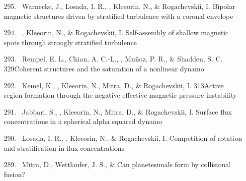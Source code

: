 \begin{itemize}
\item[{295.}~]
Warnecke, J., Losada, I. R., \Brandenburg, Kleeorin, N., \& Rogachevskii, I.
{Bipolar magnetic structures driven by stratified turbulence with a coronal envelope}

\item[{294.}~]
\Brandenburg, Kleeorin, N., \& Rogachevskii, I.
{Self-assembly of shallow magnetic spots through strongly stratified turbulence}

\item[{293.}~]
Rempel, E. L., Chian, A. C.-L., \Brandenburg, Mu\~noz, P. R., \& Shadden, S. C.
{329}{Coherent structures and the saturation of a nonlinear dynamo}

\item[{292.}~]
Kemel, K., \Brandenburg, Kleeorin, N., Mitra, D., \& Rogachevskii, I.
{313}{Active region formation through the negative effective magnetic pressure instability}

\item[{291.}~]
Jabbari, S., \Brandenburg, Kleeorin, N., Mitra, D., \& Rogachevskii, I.
{Surface flux concentrations in a spherical alpha squared dynamo}

\item[{290.}~]
Losada, I. R., \Brandenburg, Kleeorin, N., \& Rogachevskii, I.
{Competition of rotation and stratification in flux concentrations}

\item[{289.}~]
Mitra, D., Wettlaufer, J. S., \& \Brandenburg{}
{Can planetesimals form by collisional fusion?}


\end{itemize}
